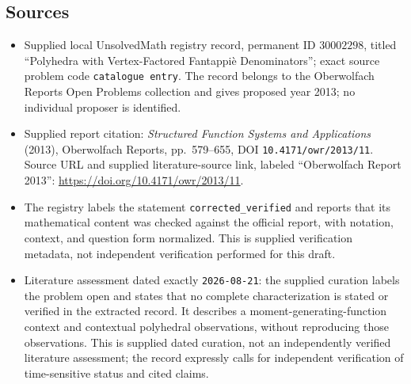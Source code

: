 \documentclass[11pt]{article}
\begin{document}
\subsection{Sources}
\begin{itemize}
\item Supplied local UnsolvedMath registry record, permanent ID \(30002298\), titled ``Polyhedra with Vertex-Factored Fantappi\`e Denominators''; exact source problem code \texttt{catalogue entry}. The record belongs to the Oberwolfach Reports Open Problems collection and gives proposed year 2013; no individual proposer is identified.
\item Supplied report citation: \emph{Structured Function Systems and Applications} (2013), Oberwolfach Reports, pp.\ 579--655, DOI \texttt{10.4171/owr/2013/11}. Source URL and supplied literature-source link, labeled ``Oberwolfach Report 2013'': \url{https://doi.org/10.4171/owr/2013/11}.
\item The registry labels the statement \texttt{corrected\_verified} and reports that its mathematical content was checked against the official report, with notation, context, and question form normalized. This is supplied verification metadata, not independent verification performed for this draft.
\item Literature assessment dated exactly \texttt{2026-08-21}: the supplied curation labels the problem open and states that no complete characterization is stated or verified in the extracted record. It describes a moment-generating-function context and contextual polyhedral observations, without reproducing those observations. This is supplied dated curation, not an independently verified literature assessment; the record expressly calls for independent verification of time-sensitive status and cited claims.
\end{itemize}
\end{document}
